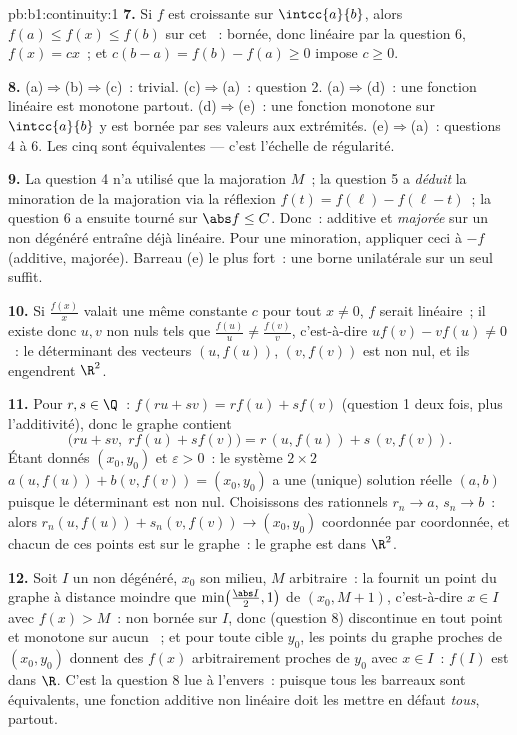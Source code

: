 \begin{solution}{pb:b1:continuity:1}
\textbf{7.} Si $f$ est croissante sur $\intcc{a}{b}$, alors
$f(a) \leq f(x) \leq f(b)$ sur cet ~: bornée, donc linéaire
par la question 6, $f(x) = cx$~; et $c(b - a) = f(b) - f(a) \geq 0$
impose $c \geq 0$.

\textbf{8.} (a)$\Rightarrow$(b)$\Rightarrow$(c)~: trivial.
(c)$\Rightarrow$(a)~: question 2. (a)$\Rightarrow$(d)~: une fonction
linéaire est monotone partout. (d)$\Rightarrow$(e)~: une fonction
monotone sur $\intcc{a}{b}$ y est bornée par ses valeurs aux
extrémités. (e)$\Rightarrow$(a)~: questions 4 à 6. Les cinq
 sont équivalentes --- c'est l'échelle de régularité.

\textbf{9.} La question 4 n'a utilisé que la majoration $M$~; la
question 5 a \emph{déduit} la minoration de la majoration via la
réflexion $f(t) = f(\ell) - f(\ell - t)$~; la question 6 a ensuite
tourné sur $\abs f \leq C$. Donc~: additive et \emph{majorée} sur un
 non dégénéré entraîne déjà linéaire. Pour une minoration,
appliquer ceci à $-f$ (additive, majorée). Barreau (e) le plus fort~:
une borne unilatérale sur un seul  suffit.

\textbf{10.} Si $\frac{f(x)}{x}$ valait une même constante $c$ pour
tout $x \neq 0$, $f$ serait linéaire~; il existe donc $u, v$ non nuls
tels que $\frac{f(u)}u \neq \frac{f(v)}v$, c'est-à-dire $u f(v) - v
f(u) \neq 0$~: le déterminant des vecteurs $(u, f(u))$, $(v,
f(v))$ est non nul, et ils engendrent $\R^2$.

\textbf{11.} Pour $r, s \in \Q$~: $f(ru + sv) = r f(u) + s f(v)$
(question 1 deux fois, plus l'additivité), donc le graphe contient
\[
\bigl(ru + sv,\; r f(u) + s f(v)\bigr)
= r\,(u, f(u)) + s\,(v, f(v)) .
\]
Étant donnés $(x_0, y_0)$ et $\varepsilon > 0$~: le système $2 \times
2$ $a(u, f(u)) + b(v, f(v)) = (x_0, y_0)$ a une (unique) solution
réelle $(a, b)$ puisque le déterminant est non nul. Choisissons des
rationnels $r_n \to a$, $s_n \to b$~: alors $r_n(u, f(u)) +
s_n(v, f(v)) \to (x_0, y_0)$ coordonnée par coordonnée, et chacun de
ces points est sur le graphe~: le graphe est  dans $\R^2$.

\textbf{12.} Soit $I$ un  non dégénéré, $x_0$ son
milieu, $M$ arbitraire~: la  fournit un point du graphe à
distance moindre que $\min\bigl(\frac{\abs I}{2}, 1\bigr)$ de $(x_0, M
+ 1)$, c'est-à-dire $x \in I$ avec $f(x) > M$~: non bornée sur $I$,
donc (question 8) discontinue en tout point et monotone sur aucun
~; et pour toute cible $y_0$, les points du graphe proches de
$(x_0, y_0)$ donnent des $f(x)$ arbitrairement proches de $y_0$ avec $x
\in I$~: $f(I)$ est  dans $\R$. C'est la question 8 lue à
l'envers~: puisque tous les barreaux sont équivalents, une fonction
additive non linéaire doit les mettre en défaut \emph{tous}, partout.


\end{solution}
